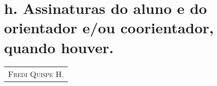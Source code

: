 \documentclass[a4paper, 11pt]{article}
\begin{document}
\section*{h. Assinaturas do aluno e do orientador e/ou coorientador, quando houver.}

\newpage

 
\vfill \hfill
\begin{tabular}{c}

\\ \hline
\textsc{Fredi Quispe H.}
\end{tabular}
\end{document}
